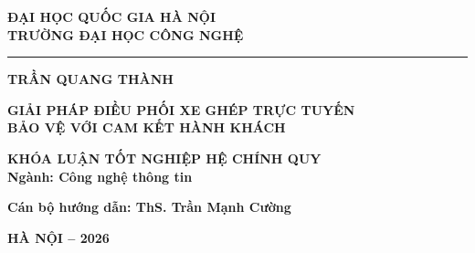 \thispagestyle{empty}
\begin{center}
\fontsize{13pt}{16pt}\selectfont

\textbf{ĐẠI HỌC QUỐC GIA HÀ NỘI}\\[2pt]
\textbf{TRƯỜNG ĐẠI HỌC CÔNG NGHỆ}

\vspace{6pt}
\rule{0.35\textwidth}{0.4pt}

\vspace{60pt}
{\fontsize{14pt}{18pt}\selectfont\textbf{TRẦN QUANG THÀNH}}

\vspace{50pt}
{\fontsize{16pt}{20pt}\selectfont\textbf{GIẢI PHÁP ĐIỀU PHỐI XE GHÉP TRỰC TUYẾN}\\[6pt]
\textbf{BẢO VỆ VỚI CAM KẾT HÀNH KHÁCH}}

\vspace{40pt}
{\fontsize{14pt}{18pt}\selectfont\textbf{KHÓA LUẬN TỐT NGHIỆP HỆ CHÍNH QUY}}\\[6pt]
\textbf{Ngành: Công nghệ thông tin}

\vspace{50pt}
\textbf{Cán bộ hướng dẫn: ThS. Trần Mạnh Cường}

\vfill
\textbf{HÀ NỘI -- 2026}
\end{center}

\clearpage

